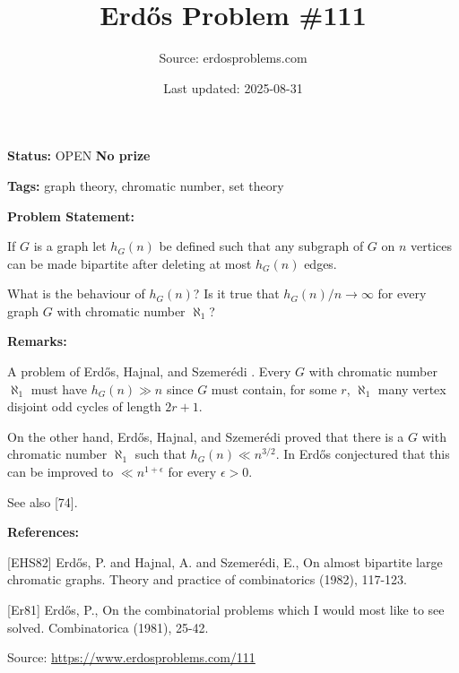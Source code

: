 \documentclass{article}
\title{Erd\H{o}s Problem \#111}
\date{Last updated: 2025-08-31}
\author{Source: erdosproblems.com}
\begin{document}
\maketitle

\noindent\textbf{Status:} OPEN \quad \textbf{No prize}

\noindent\textbf{Tags:} graph theory, chromatic number, set theory

\medskip
\noindent\textbf{Problem Statement:}

If $G$ is a graph let $h_G(n)$ be defined such that any subgraph of $G$ on $n$ vertices can be made bipartite after deleting at most $h_G(n)$ edges. 

What is the behaviour of $h_G(n)$? Is it true that $h_G(n)/n\to \infty$ for every graph $G$ with chromatic number $\aleph_1$?

\bigskip
\noindent\textbf{Remarks:}

A problem of Erd\H{o}s, Hajnal, and Szemer\'{e}di \cite{EHS82}. Every $G$ with chromatic number $\aleph_1$ must have $h_G(n)\gg n$ since $G$ must contain, for some $r$, $\aleph_1$ many vertex disjoint odd cycles of length $2r+1$. 

On the other hand, Erd\H{o}s, Hajnal, and Szemer\'{e}di proved that there is a $G$ with chromatic number $\aleph_1$ such that $h_G(n)\ll n^{3/2}$. In \cite{Er81} Erd\H{o}s conjectured that this can be improved to $\ll n^{1+\epsilon}$ for every $\epsilon>0$. 

See also [74].

\bigskip
\noindent\textbf{References:}

[EHS82] Erd\H{o}s, P. and Hajnal, A. and Szemer\'{e}di, E., On almost bipartite large chromatic graphs. Theory and practice of combinatorics (1982), 117-123.
 
 [Er81] Erd\H{o}s, P., On the combinatorial problems which I would most like to see solved. Combinatorica (1981), 25-42.

\bigskip
\noindent\small{Source: \url{https://www.erdosproblems.com/111}}
\end{document}
